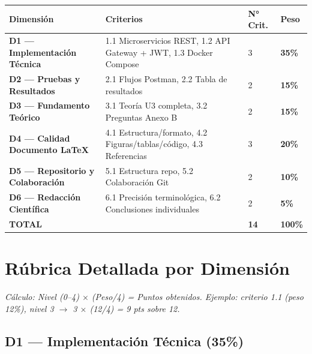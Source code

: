 \documentclass[11pt,a4paper,landscape]{article}
\begin{document}
	\begin{center}
		\begin{tabular}{|P{6.5cm}|P{11.5cm}|C{2cm}|C{2cm}|}
			\hline
			\color{white}\textbf{Dimensi\'on} & \color{white}\textbf{Criterios} & \color{white}\textbf{N° Crit.} & \color{white}\textbf{Peso}\\
			\hline
			 \textbf{D1 --- Implementaci\'on T\'ecnica} & 1.1 Microservicios REST, 1.2 API Gateway + JWT, 1.3 Docker Compose & 3 & \textbf{35\%}\\
			\hline
			\textbf{D2 --- Pruebas y Resultados} & 2.1 Flujos Postman, 2.2 Tabla de resultados & 2 & \textbf{15\%}\\
			\hline
			 \textbf{D3 --- Fundamento Te\'orico} & 3.1 Teor\'ia U3 completa, 3.2 Preguntas Anexo B & 2 & \textbf{15\%}\\
			\hline
			\textbf{D4 --- Calidad Documento LaTeX} & 4.1 Estructura/formato, 4.2 Figuras/tablas/c\'odigo, 4.3 Referencias & 3 & \textbf{20\%}\\
			\hline
			 \textbf{D5 --- Repositorio y Colaboraci\'on} & 5.1 Estructura repo, 5.2 Colaboraci\'on Git & 2 & \textbf{10\%}\\
			\hline
			\textbf{D6 --- Redacci\'on Cient\'ifica} & 6.1 Precisi\'on terminol\'ogica, 6.2 Conclusiones individuales & 2 & \textbf{5\%}\\
			\hline
			\color{white}\textbf{TOTAL} & & \color{white}\textbf{14} & \color{white}\textbf{100\%}\\
			\hline
		\end{tabular}
	\end{center}
	
	\newpage
	
	\section{R\'ubrica Detallada por Dimensi\'on}
	
	{\small\itshape C\'alculo: Nivel (0--4) $\times$ (Peso/4) = Puntos obtenidos. Ejemplo: criterio 1.1 (peso 12\%), nivel 3 $\to$ 3 $\times$ (12/4) = 9 pts sobre 12.}
	
	\vspace{6pt}
	
	\subsection{D1 --- Implementaci\'on T\'ecnica (35\%)}
	
\end{document}
